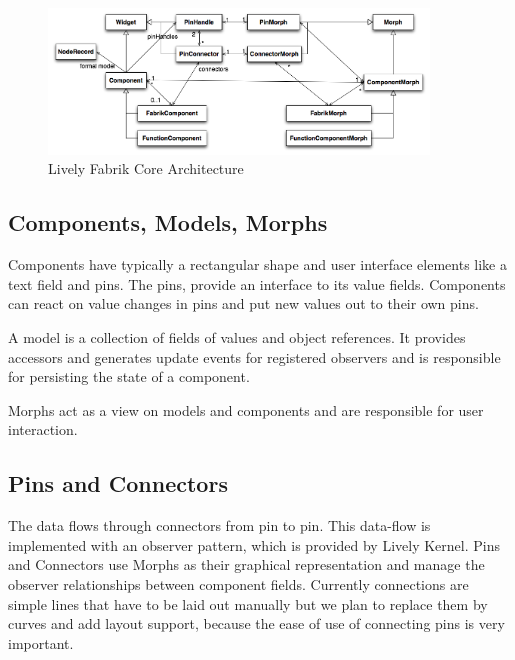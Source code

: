 \documentclass[pdftex, times, 10pt, twocolumn]{article}
\begin{document}
\begin{figure}[]\centering
\includegraphics[width=0.900000\textwidth]{LivelyFabrikCore.png} 

\caption{Lively Fabrik Core Architecture }
\label{fig:LivelyFabrikCore}
\end{figure}


\subsection{Components, Models, Morphs}
Components have typically a rectangular shape and user interface elements like a text field and pins.  The pins, provide an interface to its value fields. Components can react on value changes in pins and put new values out to their own pins.  

A model is a collection of fields of values and object references. It provides accessors and generates update events for registered observers and is responsible for persisting the state of a component. 

Morphs act as a view on models and components and are responsible for user interaction.  



\subsection{Pins and Connectors}
The data flows through connectors from pin to pin. This data-flow is implemented with an observer pattern, which is provided by Lively Kernel. Pins and Connectors use Morphs as their graphical representation and manage the observer relationships between component fields. Currently connections are simple lines that have to be laid out manually but we plan to replace them by curves and add layout support, because the ease of use of connecting pins is very important. 
\end{document}
